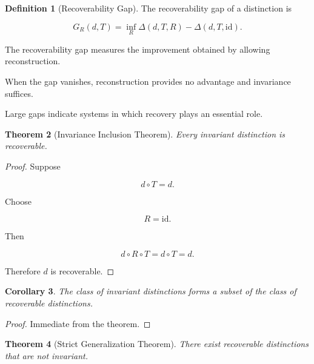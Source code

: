 \documentclass[12pt,oneside]{article}
\newtheorem{theorem}{Theorem}[section] \newtheorem{lemma}[theorem]{Lemma} \newtheorem{proposition}[theorem]{Proposition} \newtheorem{corollary}[theorem]{Corollary}
\theoremstyle{definition}
\newtheorem{definition}[theorem]{Definition} \newtheorem{axiom}[theorem]{Axiom} \newtheorem{remark}[theorem]{Remark} \newtheorem{example}[theorem]{Example}
\begin{document}
\begin{definition}[Recoverability Gap]

The recoverability gap of a distinction is

\[
G_R(d,T)
=
\inf_{R}
\Delta(d,T,R)
-
\Delta(d,T,\mathrm{id}).
\]

\end{definition}

The recoverability gap measures the improvement obtained by allowing reconstruction.

When the gap vanishes, reconstruction provides no advantage and invariance suffices.

Large gaps indicate systems in which recovery plays an essential role.

\begin{theorem}[Invariance Inclusion Theorem]

Every invariant distinction is recoverable.

\end{theorem}

\begin{proof}

Suppose

\[
d\circ T=d.
\]

Choose

\[
R=\mathrm{id}.
\]

Then

\[
d\circ R\circ T
=
d\circ T
=
d.
\]

Therefore \(d\) is recoverable.

\end{proof}

\begin{corollary}

The class of invariant distinctions forms a subset of the class of recoverable distinctions.

\end{corollary}

\begin{proof}

Immediate from the theorem.

\end{proof}

\begin{theorem}[Strict Generalization Theorem]

There exist recoverable distinctions that are not invariant.

\end{theorem}
\end{document}

